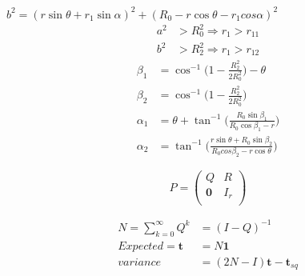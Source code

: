 \documentclass{report}
\begin{document}
$
b^2 = (r\sin\theta + r_1\sin\alpha)^2 + (R_0-r\cos\theta-r_1cos\alpha)^2
$
\begin{align*}
	a^2 &> R_0^2 \Rightarrow r_1 > r_{11} \\
	b^2 &> R_2^2 \Rightarrow r_1 > r_{12}
\end{align*}
\begin{align*}
	\beta_1 &= \cos^{-1}\bigg(1-\frac{R_2^2}{2R_0^2}\bigg) - \theta \\
	\beta_2 &= \cos^{-1}\bigg(1-\frac{R_2^2}{2R_0^2}\bigg) \\
	\alpha_1 &= \theta + \tan^{-1}\bigg( \frac{R_0\sin\beta_1}{R_0\cos\beta_1-r}\bigg)\\
	\alpha_2 &= \tan^{-1}\bigg( \frac{r\sin\theta + R_0\sin\beta_2}{R_0cos\beta_2 - r\cos\theta} \bigg)
\end{align*}

\begin{equation*}
	P  = \left(
	\begin{array}{cc}
	Q & R \\
		\mathbf{0} & I_r \\
	\end{array} \right)
\end{equation*}

\begin{align*}
	N = \sum_{k=0}^{\infty} Q^k &= (I-Q)^{-1}\\
	Expected = \mathbf{t} &= N\mathbf{1} \\
	variance &= (2N-I)\mathbf{t} - \mathbf{t}_{sq}
\end{align*}
\end{document}
